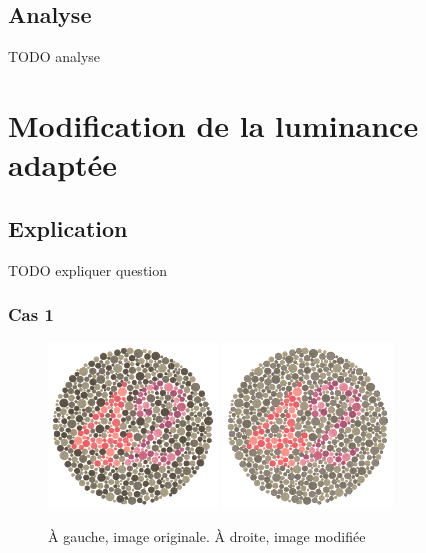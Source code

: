 \documentclass[a4paper]{article}
\begin{document}
\clearpage
\subsection{Analyse}

TODO analyse

\clearpage

\section{Modification de la luminance adaptée}

\subsection{Explication}

TODO expliquer question

\subsubsection{Cas 1}

\begin{figure}[H]
\begin{center}
\includegraphics[width=170px]{../base/cas_1_dalton42.png}
\includegraphics[width=170px]{../base/cas_1_dalton42-question5.png}
\end{center}
\caption{À gauche, image originale. À droite, image modifiée}
\end{figure}
\end{document}
